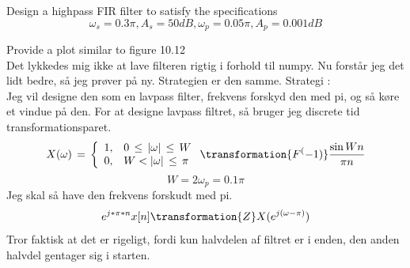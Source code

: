 \begin{Opgaver}
\begin{kapitel}
\begin{Opgave}
\begin{UnderOpgave}
            \end{UnderOpgave}
        \end{Opgave}
        \begin{Opgave}     
            Design a highpass FIR filter to satisfy the specifications 
            \[\omega_s = 0.3\pi, A_s = 50dB, \omega_p = 0.05\pi, A_p = 0.001dB\]
            \begin{UnderOpgave}
                Provide a plot similar to figure 10.12\\
                Det lykkedes mig ikke at lave filteren rigtig i forhold til numpy. Nu forstår jeg det lidt bedre, så jeg prøver på ny. 
                Strategien er den samme.
                \color{teal}Strategi : \\
                Jeg vil designe den som en lavpass filter, frekvens forskyd den med pi, og så køre et vindue på den. 
                \color{black}
                For at designe lavpass filtret, så bruger jeg discrete tid transformationsparet. 
                \[X(\omega)\,=\,\left\{\begin{array}{l l}{{1,}}&{{0\,\le\,|\omega|\,\le\,W}}\\ {{0,}}&{{W<|\omega|\,\le\,\pi}}\end{array}\right. \transformation{F^({-1})} \frac{\sin Wn}{\pi n}\]
                \[W = 2 \omega_p = 0.1\pi\]
                Jeg skal så have den frekvens forskudt med pi. 
                \[e^{j*\pi * n}x[n] \transformation{Z} X(e^{j(\omega - \pi)})\]
                Tror faktisk at det er rigeligt, fordi kun halvdelen af filtret er i enden, den anden halvdel gentager sig i starten. 
                

\end{UnderOpgave}
\end{Opgave}
\end{kapitel}
\end{Opgaver}
